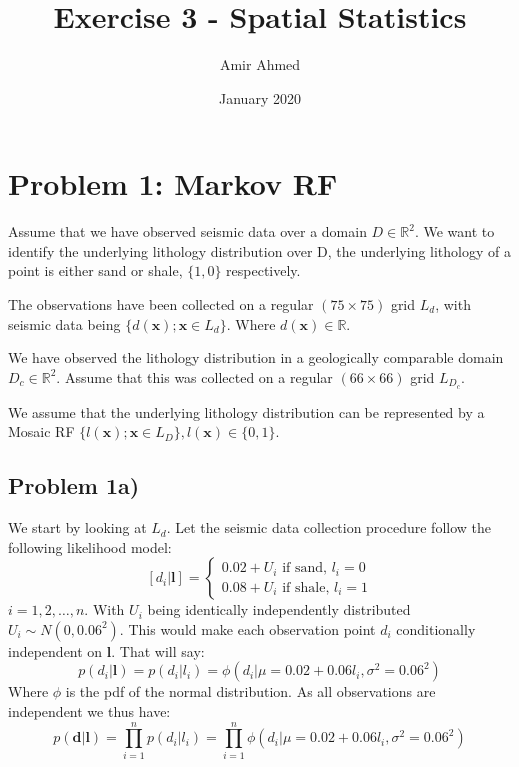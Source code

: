 \documentclass{article}
\title{Exercise 3 - Spatial Statistics}
\author{Amir Ahmed}
\date{January 2020}
\newcommand{\vect}[1]{\ensuremath{\boldsymbol{\mathbf{#1}}}}
\begin{document}
	\maketitle
	
	\section*{Problem 1: Markov RF}
	Assume that we have observed seismic data over a domain $D \in \mathbb{R}^2$. We want to identify the underlying lithology distribution over D, the underlying lithology of a point is either sand or shale, $\lbrace 1, 0 \rbrace$ respectively.
	
	The observations have been collected on a regular $(75 \times 75)$ grid $L_d$, with seismic data being $\lbrace d(\vect x); \vect x \in L_d \rbrace$. Where $d(\vect x) \in \mathbb{R}$. 
	
	We have observed the lithology distribution in a geologically comparable domain $D_c \in \mathbb{R}^2$. Assume that this was collected on a regular $(66 \times 66)$ grid $L_{D_c}$. 
	
	We assume that the underlying lithology distribution can be represented by a Mosaic RF $\lbrace l(\vect x); \vect x \in  L_D\rbrace, l(\vect x) \in \lbrace 0, 1 \rbrace$.  
	
	
	\subsection*{Problem 1a)}
	 We start by looking at $L_d$.
	 Let the seismic data collection procedure follow the following likelihood model: 
	 $$\left[d_i | \vect l \right] = \begin{cases}
	 0.02 + U_i \text{ if sand, } l_i = 0 \\
	 0.08 + U_i \text{ if shale, } l_i = 1
	 \end{cases}$$
	 $i = 1, 2, \dots, n$. With $U_i$ being identically independently distributed $U_i \sim N(0, 0.06^2)$. This would make each observation point $d_i$ conditionally independent on $\vect l$. That will say: 
	\begin{equation}
		p(d_i | \vect l) = p(d_i | l_i) = \phi(d_i |\mu = 0.02 + 0.06l_i, \sigma^2 = 0.06^2)
	\end{equation}	
	 Where $\phi$ is the pdf of the normal distribution. As all observations are independent we thus have: 
	 \begin{equation}
	 	p(\vect d | \vect l) = \prod_{i=1}^{n}p(d_i | l_i) = \prod_{i=1}^{n}  \phi(d_i |\mu = 0.02 + 0.06l_i, \sigma^2 = 0.06^2)
	 \end{equation} 
	 
\end{document}
